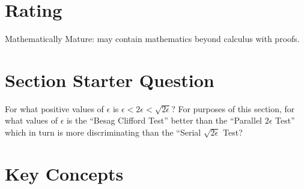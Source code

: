 \documentclass[12pt]{article}
\begin{document}
\myheader \mytitle

\hr


\hr

\usefirefox

\hr



\section*{Rating} %
Mathematically Mature:  may contain mathematics beyond calculus with
proofs. %

\hr

\section*{Section Starter Question} For what positive values of \(
\epsilon \) is \( \epsilon < 2 \epsilon < \sqrt{2 \epsilon} \)?  For
purposes of this section, for what values of \( \epsilon \) is the
``Besag Clifford Test'' better than the ``Parallel \( 2 \epsilon \)
Test'' which in turn is more discriminating than the ``Serial \( \sqrt{2
\epsilon} \) Test?

\hr

\section*{Key Concepts}
\end{document}
